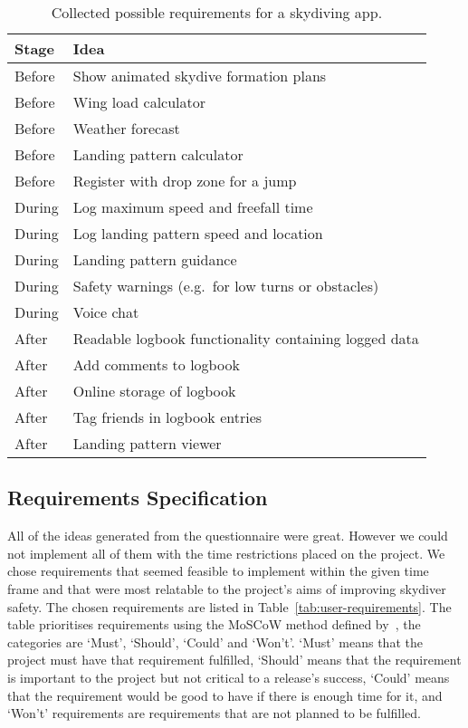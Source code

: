 \begin{table*}[ht]
  \centering
  \caption{Collected possible requirements for a skydiving app.}\label{tab:user-ideas}
  \begin{tabular}{@{}ll@{}}
    \toprule
    Stage  & Idea \\
    \midrule
    Before & Show animated skydive formation plans \\
    Before & Wing load calculator \\
    Before & Weather forecast \\
    Before & Landing pattern calculator \\
    Before & Register with drop zone for a jump \\
    During & Log maximum speed and freefall time \\
    During & Log landing pattern speed and location \\
    During & Landing pattern guidance \\
    During & Safety warnings (e.g.\ for low turns or obstacles) \\
    During & Voice chat \\
    After  & Readable logbook functionality containing logged data \\
    After  & Add comments to logbook \\
    After  & Online storage of logbook \\
    After  & Tag friends in logbook entries \\
    After  & Landing pattern viewer \\
    \bottomrule
  \end{tabular}
\end{table*}

\subsection{Requirements Specification}
All of the ideas generated from the questionnaire were great. However we could not implement all of them with the time restrictions placed on the project. We chose requirements that seemed feasible to implement within the given time frame and that were most relatable to the project's aims of improving skydiver safety. The chosen requirements are listed in Table~\vref{tab:user-requirements}. The table prioritises requirements using the MoSCoW method defined by~\citeauthor{clegg_case_1994}, the categories are `Must', `Should', `Could' and `Won't'. `Must' means that the project must have that requirement fulfilled, `Should' means that the requirement is important to the project but not critical to a release's success, `Could' means that the requirement would be good to have if there is enough time for it, and `Won't' requirements are requirements that are not planned to be fulfilled.

